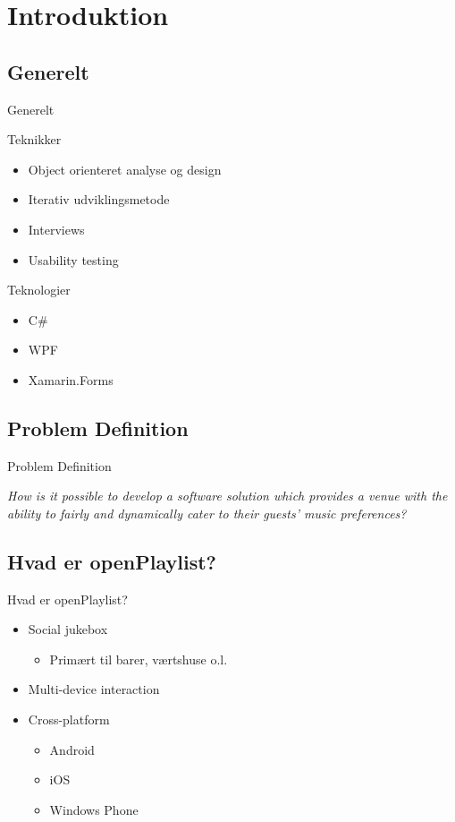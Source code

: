 \section{Introduktion}

\subsection{Generelt}
\begin{frame}{Generelt}
	\begin{multicols}{2}
		Teknikker
		\begin{itemize}
			\item Object orienteret analyse og design
			\item Iterativ udviklingsmetode
			\item Interviews
			\item Usability testing
		\end{itemize}
		
		\columnbreak
		
		Teknologier
		\begin{itemize}
			\item C\#
			\item WPF
			\item Xamarin.Forms
		\end{itemize}
	\end{multicols}
\end{frame}

\subsection{Problem Definition}
\begin{frame}{Problem Definition}
	\begin{center}
		\textit{How is it possible to develop a software solution which provides a venue with the ability to fairly and dynamically cater to their guests' music preferences?}
	\end{center}
\end{frame}

\subsection{Hvad er openPlaylist?}
\begin{frame}{Hvad er openPlaylist?}
	\begin{itemize}
		\item Social jukebox
		\begin{itemize}
			\item Primært til barer, værtshuse o.l.
		\end{itemize}
		\item Multi-device interaction
		\item Cross-platform
		\begin{itemize}
			\item Android
			\item iOS
			\item Windows Phone
		\end{itemize}
	\end{itemize}
\end{frame}

